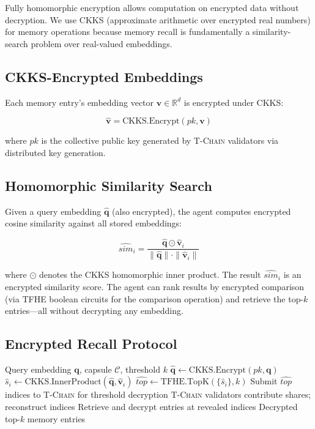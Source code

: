 \documentclass[11pt,letterpaper]{article}
\theoremstyle{definition}
\theoremstyle{remark}
\newcommand{\TChain}{\textsc{T-Chain}}
\newcommand{\CKKS}{\textsc{CKKS}}
\newcommand{\TFHE}{\textsc{TFHE}}
\begin{document}
Fully homomorphic encryption allows computation on encrypted data without decryption. We use \CKKS{} (approximate arithmetic over encrypted real numbers) for memory operations because memory recall is fundamentally a similarity-search problem over real-valued embeddings.

\subsection{CKKS-Encrypted Embeddings}

Each memory entry's embedding vector $\mathbf{v} \in \mathbb{R}^d$ is encrypted under \CKKS{}:

\begin{equation}
\hat{\mathbf{v}} = \text{CKKS.Encrypt}(pk, \mathbf{v})
\end{equation}

where $pk$ is the collective public key generated by \TChain{} validators via distributed key generation.

\subsection{Homomorphic Similarity Search}

Given a query embedding $\hat{\mathbf{q}}$ (also encrypted), the agent computes encrypted cosine similarity against all stored embeddings:

\begin{equation}
\widehat{\textit{sim}}_i = \frac{\hat{\mathbf{q}} \odot \hat{\mathbf{v}}_i}{\|\hat{\mathbf{q}}\| \cdot \|\hat{\mathbf{v}}_i\|}
\end{equation}

where $\odot$ denotes the \CKKS{} homomorphic inner product. The result $\widehat{\textit{sim}}_i$ is an encrypted similarity score. The agent can rank results by encrypted comparison (via \TFHE{} boolean circuits for the comparison operation) and retrieve the top-$k$ entries---all without decrypting any embedding.

\subsection{Encrypted Recall Protocol}

\begin{algorithm}
\caption{FHE-Encrypted Memory Recall}
\begin{algorithmic}[1]
\REQUIRE Query embedding $\mathbf{q}$, capsule $\mathcal{C}$, threshold $k$
\STATE $\hat{\mathbf{q}} \leftarrow \text{CKKS.Encrypt}(pk, \mathbf{q})$
    \STATE $\hat{s}_i \leftarrow \text{CKKS.InnerProduct}(\hat{\mathbf{q}}, \hat{\mathbf{v}}_i)$
\ENDFOR
\STATE $\hat{\textit{top}} \leftarrow \text{TFHE.TopK}(\{\hat{s}_i\}, k)$ 
\STATE Submit $\hat{\textit{top}}$ indices to \TChain{} for threshold decryption
\STATE \TChain{} validators contribute shares; reconstruct indices
\STATE Retrieve and decrypt entries at revealed indices
\RETURN Decrypted top-$k$ memory entries
\end{algorithmic}
\end{algorithm}
\end{document}
